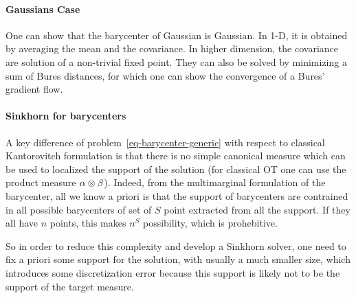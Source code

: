 \paragraph{Gaussians Case}

One can show that the barycenter of Gaussian is Gaussian. In 1-D, it is obtained by averaging the mean and the covariance. In higher dimension, the covariance are solution of a non-trivial fixed point. They can also be solved by minimizing a sum of Bures distances, for which one can show the convergence of a Bures' gradient flow.


\paragraph{Sinkhorn for barycenters}

A key difference of problem~\eqref{eq-barycenter-generic} with respect to classical Kantorovitch formulation is that there is no simple canonical measure which can be used to localized the support of the solution (for classical OT one can use the product measure $\alpha \otimes \beta$). 
%
Indeed, from the multimarginal formulation of the barycenter, all we know a priori is that the support of barycenters are contrained in all possible barycenters of set of $S$ point extracted from all the support. If they all have $n$ points, this makes $n^S$ possibility, which is prohebitive.

So in order to reduce this complexity and develop a Sinkhorn solver, one need to fix a priori some support for the solution, with usually a much smaller size, which introduces some discretization error because this support is likely not to be the support of the target measure.

